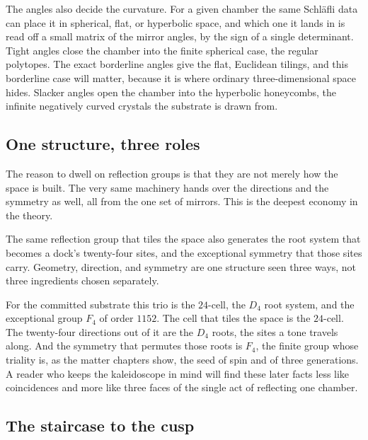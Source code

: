 The angles also decide the curvature. For a given chamber the same Schl\"afli data can place it in spherical, flat, or hyperbolic space, and which one it lands in is read off a small matrix of the mirror angles, by the sign of a single determinant. Tight angles close the chamber into the finite spherical case, the regular polytopes. The exact borderline angles give the flat, Euclidean tilings, and this borderline case will matter, because it is where ordinary three-dimensional space hides. Slacker angles open the chamber into the hyperbolic honeycombs, the infinite negatively curved crystals the substrate is drawn from.

\subsection{One structure, three roles}

The reason to dwell on reflection groups is that they are not merely how the space is built. The very same machinery hands over the directions and the symmetry as well, all from the one set of mirrors. This is the deepest economy in the theory.

\begin{principle}
The same reflection group that tiles the space also generates the root system that becomes a dock's twenty-four sites, and the exceptional symmetry that those sites carry. Geometry, direction, and symmetry are one structure seen three ways, not three ingredients chosen separately.
\end{principle}

For the committed substrate this trio is the $24$-cell, the $D_4$ root system, and the exceptional group $F_4$ of order $1152$. The cell that tiles the space is the $24$-cell. The twenty-four directions out of it are the $D_4$ roots, the sites a tone travels along. And the symmetry that permutes those roots is $F_4$, the finite group whose triality is, as the matter chapters show, the seed of spin and of three generations. A reader who keeps the kaleidoscope in mind will find these later facts less like coincidences and more like three faces of the single act of reflecting one chamber.

\subsection{The staircase to the cusp}

